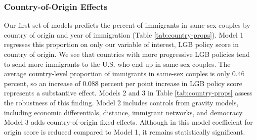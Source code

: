 \documentclass[
  11pt,
]{article}
\begin{document}
\hypertarget{country-of-origin-effects}{%
\subsubsection{Country-of-Origin Effects}\label{country-of-origin-effects}}

Our first set of models predicts the percent of immigrants in same-sex couples by country of origin and year of immigration (Table \ref{tab:country-props}). Model 1 regresses this proportion on only our variable of interest, LGB policy score in country of origin. We see that countries with more progressive LGB policies tend to send more immigrants to the U.S. who end up in same-sex couples. The average country-level proportion of immigrants in same-sex couples is only 0.46 percent, so an increase of 0.088 percent per point increase in LGB policy score represents a substantive effect. Models 2 and 3 in Table \ref{tab:country-props} assess the robustness of this finding. Model 2 includes controls from gravity models, including economic differentials, distance, immigrant networks, and democracy. Model 3 adds country-of-origin fixed effects. Although in this model coefficient for origin score is reduced compared to Model 1, it remains statistically significant.
\end{document}
